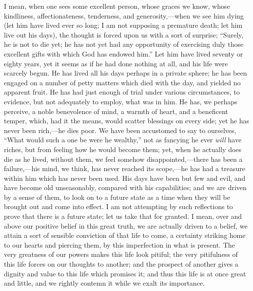 I mean, when one sees some excellent person, whose graces we know,
whose kindliness, affectionateness, tenderness, and generosity,—when
we see him dying (let him have lived ever so long; I am not supposing
a premature death; let him live out his days), the thought is forced
upon us with a sort of surprise; ``Surely, he is not to die yet;
he has not yet had any opportunity of exercising duly those excellent
gifts with which God has endowed him.'' Let him have lived seventy
or eighty years, yet it seems as if he had done nothing at all, and
his life were scarcely begun. He has lived all his days perhaps in a
private sphere; he has been engaged on a number of petty matters which
died with the day, and yielded no apparent fruit. He has had just
enough of trial under various circumstances, to evidence, but not
adequately to employ, what was in him. He has, we perhaps perceive, a
noble benevolence of mind, a warmth of heart, and a beneficent temper,
which, had it the means, would scatter blessings on every side; yet he
has never been rich,—he dies poor. We have been accustomed to say to
ourselves, ``What would such a one be were he wealthy,'' not
as fancying he ever \emph{will} have riches, but from feeling how he
would become them; yet, when he actually does die as he lived, without
them, we feel somehow disappointed,—there has been a failure,—his
mind, we think, has never reached its scope,—he has had a treasure
within him which has never been used. His days have been but few and
evil, and have become old unseasonably, compared with his
capabilities; and we are driven by a sense of them, to look on to a
future state as a time when they will be brought out and come into
effect. I am not attempting by such reflections to prove that there is
a future state; let us take that for granted. I mean, over and above
our positive belief in this great truth, we are actually driven to a
belief, we attain a sort of sensible conviction of that life to come,
a certainty striking home to our hearts and piercing them, by this
imperfection in what is present. The very greatness of our powers
makes this life look pitiful; the very pitifulness of this life forces
on our thoughts to another; and the prospect of another gives a
dignity and value to this life which promises it; and thus this life
is at once great and little, and we rightly contemn it while we exalt
its importance.

